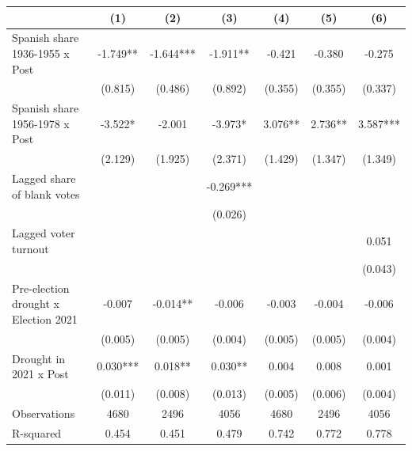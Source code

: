 \begin{table}
\centering
\begin{tabular}[t]{lcccccc}
\toprule
  & (1) & (2) & (3) & (4) & (5) & (6)\\
\midrule
Spanish share 1936-1955 x Post & -1.749** & -1.644*** & -1.911** & -0.421 & -0.380 & -0.275\\
 & (0.815) & (0.486) & (0.892) & (0.355) & (0.355) & (0.337)\\
Spanish share 1956-1978 x Post & -3.522* & -2.001 & -3.973* & 3.076** & 2.736** & 3.587***\\
 & (2.129) & (1.925) & (2.371) & (1.429) & (1.347) & (1.349)\\
Lagged share of blank votes &  &  & -0.269*** &  &  & \\
 &  &  & (0.026) &  &  & \\
Lagged voter turnout &  &  &  &  &  & 0.051\\
 &  &  &  &  &  & (0.043)\\
Pre-election drought x Election 2021 & -0.007 & -0.014** & -0.006 & -0.003 & -0.004 & -0.006\\
 & (0.005) & (0.005) & (0.004) & (0.005) & (0.005) & (0.004)\\
Drought in 2021 x Post & 0.030*** & 0.018** & 0.030** & 0.004 & 0.008 & 0.001\\
 & (0.011) & (0.008) & (0.013) & (0.005) & (0.006) & (0.004)\\
\midrule
Observations & 4680 & 2496 & 4056 & 4680 & 2496 & 4056\\
R-squared & 0.454 & 0.451 & 0.479 & 0.742 & 0.772 & 0.778\\
\bottomrule
\end{tabular}
\end{table}
